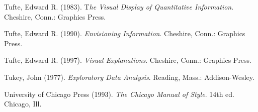 \begin{multicols}{2}
Tufte, Edward R. (1983). T\emph{he Visual Display of Quantitative
Information}. Cheshire, Conn.: Graphics Press.

Tufte, Edward R. (1990). \emph{Envisioning Information}. Cheshire,
Conn.: Graphics Press.

Tufte, Edward R. (1997). \emph{Visual Explanations}. Cheshire,
Conn.: Graphics Press.

Tukey, John (1977). \emph{Exploratory Data Analysis}. Reading,
Mass.: Addison-Wesley.

University of Chicago Press (1993). \emph{The Chicago Manual of
Style}. 14th ed. Chicago, Ill.


\end{multicols}
